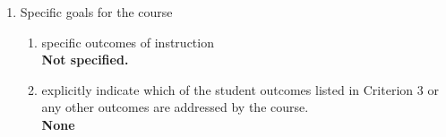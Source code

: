 \begin{enumerate}[1.]
\begin{enumerate}[a.]
\item prerequisites or co-requisites\\
  {\bfseries
    Prerequisites: MA229 or CSC215 (Minimum Grade C-) 
  }

\item indicate whether a required, elective, or selected elective\\ %
  {\bfseries
    Selected elective\footnote{Students can take this as either a CSC elective or a Math elective, but not both.}
  }

\end{enumerate}

\item Specific goals for the course
\begin{enumerate}
\item specific outcomes of instruction\\ %
  {\bfseries
    Not specified.
  }

\item explicitly indicate which of the student outcomes listed in Criterion 3 or any other outcomes are addressed by the course.\\
  {\bfseries
    None
  }
\end{enumerate}


\end{enumerate}
